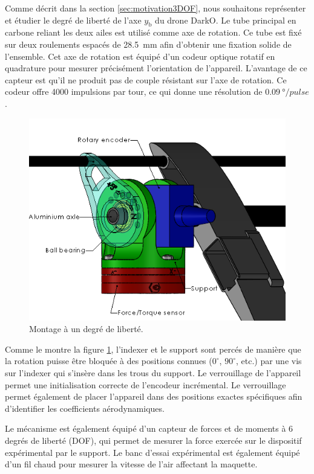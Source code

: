Comme décrit dans la section \ref{sec:motivation3DOF}, nous souhaitons représenter et étudier le degré de liberté de l'axe $y_{\text{b}}$ du drone DarkO. Le tube principal en carbone reliant les deux ailes est utilisé comme axe de rotation. Ce tube est fixé sur deux roulements espacés de \SI{28.5}{\milli\meter} afin d'obtenir une fixation solide de l'ensemble. Cet axe de rotation est équipé d'un codeur optique rotatif en quadrature pour mesurer précisément l'orientation de l'appareil. L'avantage de ce capteur est qu'il ne produit pas de couple résistant sur l'axe de rotation. Ce codeur offre 4000 impulsions par tour, ce qui donne une résolution de $\SI{0.09}{\degree}/pulse$.
\begin{figure}[!ht]
    \centering
    \includegraphics[width=0.8\columnwidth]{figures/MontageSupport2.PNG}
    \caption{Montage à un degré de liberté.}
    \label{fig:rotation}
\end{figure} 

Comme le montre la figure \ref{fig:rotation}, l'indexer et le support sont percés de manière que la rotation puisse être bloquée à des positions connues ($0^\circ$, $90^\circ$, etc.) par une vis sur l'indexer qui s'insère dans les trous du support. Le verrouillage de l'appareil permet une initialisation correcte de l'encodeur incrémental. Le verrouillage permet également de placer l'appareil dans des positions exactes spécifiques afin d'identifier les coefficients aérodynamiques. 

Le mécanisme est également équipé d'un capteur de forces et de moments à 6 degrés de liberté (DOF), qui permet de mesurer la force exercée sur le dispositif expérimental par le support. Le banc d'essai expérimental est également équipé d'un fil chaud pour mesurer la vitesse de l'air affectant la maquette. 

